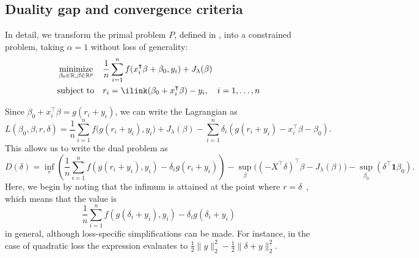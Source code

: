 \documentclass[article]{jss}
\let\Cref\crtCref
\begin{document}


\newpage

\begin{appendix}

  \section{Duality gap and convergence criteria}
  \label{sec:convergence-criteria-details}

  In detail, we transform the primal problem \(P\), defined in \Cref{eq:slope}, into a
  constrained problem, taking \(\alpha = 1\) without loss of generality:
  \begin{equation}
    \label{eq:slope-constrained}
    \begin{aligned}
       & \minimize_{\beta_0 \in \mathbb{R},\beta \in \mathbb{R}^p} &  & \frac{1}{n} \sum_{i=1}^n f(x_i^\intercal \beta + \beta_0, y_i) + J_{\lambda}(\beta) \\
       & \text{subject to}                                         &  & r_i = \ilink(\beta_0 + x_i^\intercal \beta) - y_i, \quad i = 1, \ldots, n           \\
    \end{aligned}
  \end{equation}

  Since \(\beta_0 + x_i^\intercal \beta = g(r_i + y_i)\), we can write the Lagrangian as
  \[
    L(\beta_0,\beta,r,\delta) = \frac{1}{n} \sum_{i=1}^n f\big(g(r_i + y_i), y_i\big) + J_{\lambda}(\beta) - \sum_{i=1}^n \delta_i \left(g(r_i + y_i) - x_i^\intercal \beta - \beta_0 \right).
  \]
  This allows us to write the dual problem as
  \[
    D(\delta)  = \inf_r\left( \frac{1}{n} \sum_{i=1}^n f\left(g(r_i+y_i), y_i\right) - \delta_i g(r_i+ y_i)\right)
    - \sup_\beta \big((-X^\intercal \delta)^\intercal \beta -  J_\lambda(\beta) \big)
    - \sup_{\beta_0} \left( \delta^\intercal \bm{1} \beta_0\right).
  \]
  Here, we begin by noting that the infimum is attained at the point where
  \(r = \delta\)~\citep{fercoq2015}, which means that the value is
  \[
    \frac{1}{n} \sum_{i=1}^n f\left(g(\delta_i+y_i), y_i\right) - \delta_i g(\delta_i + y_i)
  \]
  in general, although loss-specific simplifications can be made. For instance, in the case of
  quadratic loss the expression evaluates to \(\frac{1}{2} \lVert y \rVert_2^2 - \frac{1}{2} \lVert \delta + y \lVert^2_2 \).


\end{appendix}
\end{document}
